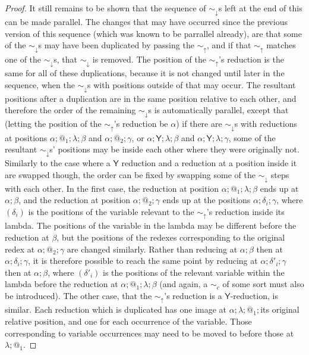 \documentclass{article}
\newcommand{\tY}{\mathsf{Y}}
\theoremstyle{definition}
\theoremstyle{lemma}
\theoremstyle{remark}
\begin{document}
\begin{proof}
  It still remains to be shown that the sequence of $\sim_\downarrow$s left at the end of this can be made parallel. The changes that may have occurred since the previous version of this sequence (which was known to be parrallel already), are that some of the $\sim_\downarrow$s may have been duplicated by passing the $\sim_\uparrow$, and if that $\sim_\uparrow$ matches one of the $\sim_\downarrow$s, that $\sim_\downarrow$ is removed. The position of the $\sim_\uparrow$'s reduction is the same for all of these duplications, because it is not changed until later in the sequence, when the $\sim_\downarrow$s with positions outside of that may occur. The resultant positions after a duplication are in the same position relative to each other, and therefore the order of the remaining $\sim_\downarrow$s is automatically parallel, except that (letting the position of the $\sim_\uparrow$'s reduction be $\alpha$) if there are $\sim_\downarrow$s with reductions at positions $\alpha;@_1;\lambda;\beta$ and $\alpha;@_2;\gamma$, or $\alpha;\tY;\lambda;\beta$ and $\alpha;\tY;\lambda;\gamma$, some of the resultant $\sim_\downarrow$s' positions may be inside each other where they were originally not. Similarly to the case where a $\tY$ reduction and a reduction at a position inside it are swapped though, the order can be fixed by swapping some of the $\sim_\downarrow$ steps with each other. In the first case, the reduction at position $\alpha;@_1;\lambda;\beta$ ends up at $\alpha;\beta$, and the reduction at position $\alpha;@_2;\gamma$ ends up at the positions $\alpha;\delta_i;\gamma$, where $(\delta_i)$ is the positions of the variable relevant to the $\sim_\uparrow$'s reduction inside its lambda. The positions of the variable in the lambda may be different before the reduction at $\beta$, but the positions of the redexes corresponding to the original redex at $\alpha;@_2;\gamma$ are changed similarly. Rather than reducing at $\alpha;\beta$ then at $\alpha;\delta_i;\gamma$, it is therefore possible to reach the same point by reducing at $\alpha;\delta'_i;\gamma$ then at $\alpha;\beta$, where $(\delta'_i)$ is the positions of the relevant variable within the lambda before the reduction at $\alpha;@_1;\lambda;\beta$ (and again, a $\sim_c$ of some sort must also be introduced). The other case, that the $\sim_\uparrow$'s reduction is a $\tY$-reduction, is similar. Each reduction which is duplicated has one image at $\alpha;\lambda;@_1;$its original relative position, and one for each occurrence of the variable. Those corresponding to variable occurrences may need to be moved to before those at $\lambda;@_1$.


\end{proof}
\end{document}
